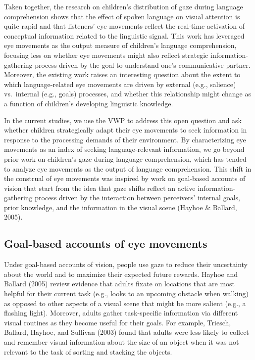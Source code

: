 \documentclass[,man,floatsintext]{apa6}
\begin{document}
Taken together, the research on children's distribution of gaze during language comprehension shows that the effect of spoken language on visual attention is quite rapid and that listeners' eye movements reflect the real-time activation of conceptual information related to the linguistic signal. This work has leveraged eye movements as the output measure of children's language comprehension, focusing less on whether eye movements might also reflect strategic information-gathering process driven by the goal to understand one's communicative partner. Moreover, the existing work raises an interesting question about the extent to which language-related eye movements are driven by external (e.g., salience) vs.~internal (e.g., goals) processes, and whether this relationship might change as a function of children's developing linguistic knowledge.

In the current studies, we use the VWP to address this open question and ask whether children strategically adapt their eye movements to seek information in response to the processing demands of their environment. By characterizing eye movements as an index of seeking language-relevant information, we go beyond prior work on children's gaze during language comprehension, which has tended to analyze eye movements as the output of language comprehension. This shift in the construal of eye movements was inspired by work on goal-based accounts of vision that start from the idea that gaze shifts reflect an active information-gathering process driven by the interaction between perceivers' internal goals, prior knowledge, and the information in the visual scene (Hayhoe \& Ballard, 2005).

\hypertarget{goal-based-accounts-of-eye-movements}{%
\subsection{Goal-based accounts of eye movements}\label{goal-based-accounts-of-eye-movements}}

Under goal-based accounts of vision, people use gaze to reduce their uncertainty about the world and to maximize their expected future rewards. Hayhoe and Ballard (2005) review evidence that adults fixate on locations that are most helpful for their current task (e.g., looks to an upcoming obstacle when walking) as opposed to other aspects of a visual scene that might be more salient (e.g., a flashing light). Moreover, adults gather task-specific information via different visual routines as they become useful for their goals. For example, Triesch, Ballard, Hayhoe, and Sullivan (2003) found that adults were less likely to collect and remember visual information about the size of an object when it was not relevant to the task of sorting and stacking the objects.
\end{document}
